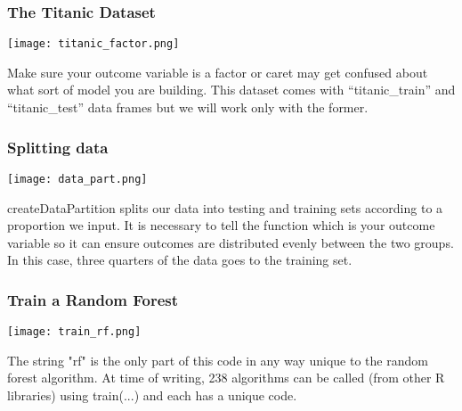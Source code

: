 \documentclass[presentation]{beamer}
\begin{document}

\begin{frame}
\frametitle{The Titanic Dataset}

\texttt{[image: titanic\_factor.png]}

\vspace{5mm}

Make sure your outcome variable is a factor or caret may get confused about what sort of model you are building.  This dataset comes with ``titanic\_train'' and ``titanic\_test'' data frames but we will work only with the former.

\end{frame}


\begin{frame}
\frametitle{Splitting data}

\texttt{[image: data\_part.png]}

\vspace{5mm}

createDataPartition splits our data into testing and training sets according to a proportion we input.  It is necessary to tell the function which is your outcome variable so it can ensure outcomes are distributed evenly between the two groups.  In this case, three quarters of the data goes to the training set.

\end{frame}


\begin{frame}
\frametitle{Train a Random Forest}

\texttt{[image: train\_rf.png]}

\vspace{5mm}

The string "rf" is the only part of this code in any way unique to the random forest algorithm.  At time of writing, 238 algorithms can be called (from other R libraries) using train(...) and each has a unique code.  

\end{frame}

\end{document}
